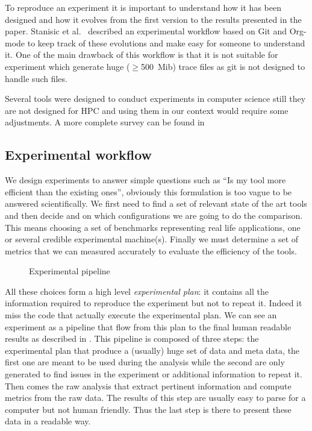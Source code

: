 To reproduce an experiment it is important to understand how it has been designed and how it evolves from the first version to the results presented in the paper.
Stanisic et al.~\cite[Chapter~4, p31-44]{Stanisic15Reproducible} described an experimental workflow based on \gls{Git} and \gls{Org-mode} to keep track of these evolutions and make easy for someone to understand it.
One of the main drawback of this workflow is that it is not suitable for experiment which generate huge ($\ge$\SI{500}{Mib}) trace files as git is not designed to handle such files.

Several tools were designed to conduct experiments in computer science still they are not designed for \gls{HPC} and using them in our context would require some adjustments.
A more complete survey can be found in~\cite[Chapter~3, p17-19]{Stanisic15Reproducible}

\subsection{Experimental workflow}

We design experiments to answer simple questions such as ``Is my tool more efficient than the existing ones'', obviously this formulation is too vague to be answered scientifically.
We first need to find a set of relevant state of the art tools and then decide and on which configurations we are going to do the comparison.
This means choosing a set of benchmarks representing real life applications, one or several credible experimental machine(s).
Finally we must determine a set of metrics that we can measured accurately to evaluate the efficiency of the tools.

\begin{figure}[htb]
    \centering
    
    \caption{Experimental pipeline}
    \label{fig:exp-pipeline}
\end{figure}

All these choices form a high level \emph{experimental plan}: it contains all the information required to reproduce the experiment but not to repeat it.
Indeed it miss the code that actually execute the experimental plan.
We can see an experiment as a pipeline that flow from this plan to the final human readable results as described in .
This pipeline is composed of three steps: the experimental plan that produce a (usually) huge set of data and meta data, the first one are meant to be used during the analysis while the second are only generated to find issues in the experiment or additional information to repeat it.
Then comes the raw analysis that extract pertinent information and compute metrics from the raw data.
The results of this step are usually easy to parse for a computer but not human friendly.
Thus the last step is there to present these data in a readable way.

